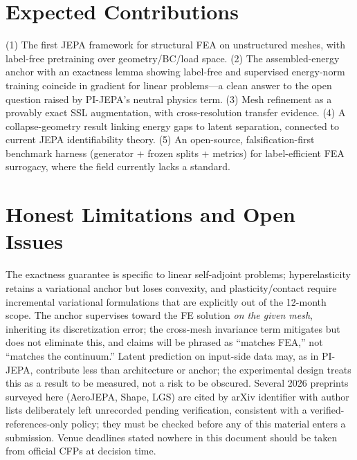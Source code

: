 \documentclass[11pt]{article}
\begin{document}
\section{Expected Contributions}
\label{sec:contrib}

(1) The first JEPA framework for structural FEA on unstructured meshes, with
label-free pretraining over geometry/BC/load space. (2) The assembled-energy
anchor with an exactness lemma showing label-free and supervised energy-norm
training coincide in gradient for linear problems---a clean answer to the
open question raised by PI-JEPA's neutral physics term. (3) Mesh refinement
as a provably exact SSL augmentation, with cross-resolution transfer
evidence. (4) A collapse-geometry result linking energy gaps to latent
separation, connected to current JEPA identifiability theory. (5) An
open-source, falsification-first benchmark harness (generator + frozen
splits + metrics) for label-efficient FEA surrogacy, where the field
currently lacks a standard.

\section{Honest Limitations and Open Issues}
\label{sec:limits}

The exactness guarantee is specific to linear self-adjoint problems;
hyperelasticity retains a variational anchor but loses convexity, and
plasticity/contact require incremental variational formulations that are
explicitly out of the 12-month scope. The anchor supervises toward the FE
solution \emph{on the given mesh}, inheriting its discretization error; the
cross-mesh invariance term mitigates but does not eliminate this, and claims
will be phrased as ``matches FEA,'' not ``matches the continuum.'' Latent
prediction on input-side data may, as in PI-JEPA, contribute less than
architecture or anchor; the experimental design treats this as a result to
be measured, not a risk to be obscured. Several 2026 preprints surveyed here
(AeroJEPA, Shape, LGS) are cited by arXiv identifier with author lists
deliberately left unrecorded pending verification, consistent with a
verified-references-only policy; they must be checked before any of this
material enters a submission. Venue deadlines stated nowhere in this
document should be taken from official CFPs at decision time.
\end{document}
